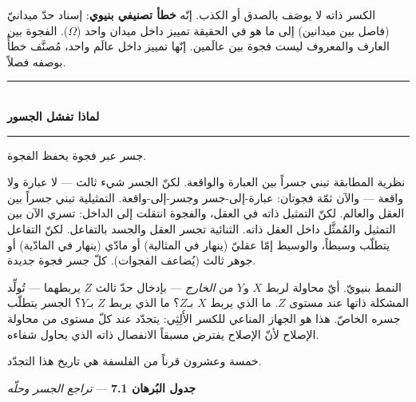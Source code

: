 \documentclass[10pt, openany, oneside]{book}
\renewcommand{\normalsize}{\fontsize{10}{13}\selectfont}
\begin{document}
الكسر ذاته لا يوصَف بالصدق أو الكذب. إنّه \textbf{خطأ تصنيفي بنيوي}: إسناد حدّ ميدانيّ (فاصل بين ميدانين) إلى ما هو في الحقيقة تمييز داخل ميدان واحد ($\Omega$). الفجوة بين العارف والمعروف ليست فجوة بين عالَمين. إنّها تمييز داخل عالَم واحد، مُصنَّف خطأً بوصفه فصلاً.

\vspace{1.5em}



\begin{center}
    \rule{0.3\textwidth}{0.4pt}\\[0.5em]
    {\normalsize\bfseries لماذا تفشل الجسور}\\[0.3em]
    \rule{0.3\textwidth}{0.4pt}
\end{center}

\vspace{1em}

\noindent جسر عبر فجوة يحفظ الفجوة.

نظرية المطابقة تبني جسراً بين العبارة والواقعة. لكنّ الجسر شيء ثالث --- لا عبارة ولا واقعة --- والآن ثمّة فجوتان: عبارة-إلى-جسر وجسر-إلى-واقعة. التمثيلية تبني جسراً بين العقل والعالم. لكنّ التمثيل ذاته في العقل، والفجوة انتقلت إلى الداخل: تسري الآن بين التمثيل والمُمثَّل داخل العقل ذاته. الثنائية تجسر العقل والجسد بالتفاعل. لكنّ التفاعل يتطلّب وسيطاً، والوسيط إمّا عقليّ (ينهار في المثالية) أو مادّي (ينهار في المادّية) أو جوهر ثالث (يُضاعف الفجوات). كلّ جسر فجوة جديدة.

النمط بنيويّ. أيّ محاولة لربط $X$ و$Y$ من \textit{الخارج} --- بإدخال حدّ ثالث $Z$ يربطهما --- تُولِّد المشكلة ذاتها عند مستوى $Z$. ما الذي يربط $X$ بـ$Z$؟ ما الذي يربط $Z$ بـ$Y$؟ الجسر يتطلّب جسره الخاصّ. هذا هو الجهاز المناعي للكسر الأَلِثِي: يتجدّد عند كلّ مستوى من محاولة الإصلاح لأنّ الإصلاح يفترض مسبقاً الانفصال ذاته الذي يحاول شفاءه.

خمسة وعشرون قرناً من الفلسفة هي تاريخ هذا التجدّد.

\vspace{0.5em}

\textbf{جدول البُرهان 7.1} --- \textit{تراجع الجسر وحلّه}

\vspace{0.5em}
\end{document}
